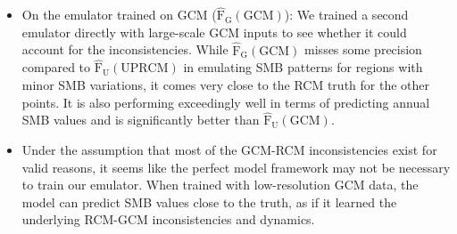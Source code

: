 \documentclass[a4paper,11pt,oneside]{report}
\begin{document}
\begin{itemize}
     \item On the emulator trained on GCM ($\mathrm{\hat{F}_{G}(GCM)}$): We trained a second emulator directly with large-scale GCM inputs to see whether it could account for the inconsistencies. While $\mathrm{\hat{F}_{G}(GCM)}$ misses some precision compared to $\mathrm{\hat{F}_{U}(UPRCM)}$ in emulating SMB patterns for regions with minor SMB variations, it comes very close to the RCM truth for the other points. It is also performing exceedingly well in terms of predicting annual SMB values and is significantly better than $\mathrm{\hat{F}_{U}(GCM)}$. 
     \item Under the assumption that most of the GCM-RCM inconsistencies exist for valid reasons, it seems like the perfect model framework may not be necessary to train our emulator. When trained with low-resolution GCM data, the model can predict SMB values close to the truth, as if it learned the underlying RCM-GCM inconsistencies and dynamics.   
\end{itemize}
\end{document}

